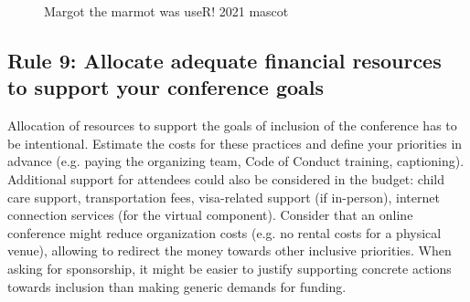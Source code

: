 \documentclass[10pt,letterpaper]{article}
\begin{document}
\begin{figure}[!h]
\centering
{}
\caption{Margot the marmot was useR! 2021 mascot}
\label{fig:marmots}
\end{figure}

\subsection*{Rule 9: Allocate adequate financial resources to support your conference goals}
\label{rule_financial}

Allocation of resources to support the goals of inclusion of the conference has to be intentional. 
Estimate the costs for these practices and define your priorities in advance (e.g. paying the organizing team, Code of Conduct training, captioning).
Additional support for attendees could also be considered in the budget: child care support, transportation fees, visa-related support (if in-person), internet connection services (for the virtual component). 
Consider that an online conference might reduce organization costs (e.g. no rental costs for a physical venue), allowing to redirect the money towards other inclusive priorities. 
When asking for sponsorship, it might be easier to justify supporting concrete actions towards inclusion than making generic demands for funding.
\end{document}
